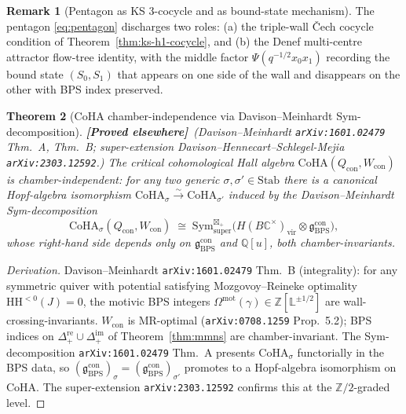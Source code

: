 \documentclass[11pt]{amsart}
\newtheorem{theorem}{Theorem}[section]
\theoremstyle{definition}
\newtheorem{remark}[theorem]{Remark}
\providecommand{\CoHA}{\mathrm{CoHA}}
\providecommand{\bZ}{\mathbb{Z}}
\providecommand{\bC}{\mathbb{C}}
\providecommand{\bL}{\mathbb{L}}
\providecommand{\bQ}{\mathbb{Q}}
\providecommand{\fg}{\mathfrak{g}}
\providecommand{\ClaimStatusProvedElsewhere}{\textbf{\textsf{[Proved elsewhere]}}}
\begin{document}
\begin{remark}[Pentagon as KS 3-cocycle and as bound-state mechanism]
\label{rem:pentagon-cocycle}
The pentagon \eqref{eq:pentagon} discharges two roles: (a) the
triple-wall \v{C}ech cocycle condition of
Theorem~\ref{thm:ks-h1-cocycle}, and (b) the Denef multi-centre
attractor flow-tree identity, with the middle factor $\Psi(q^{-1/2}
x_0 x_1)$ recording the bound state $(S_0, S_1)$ that appears on one
side of the wall and disappears on the other with BPS index
preserved.
\end{remark}

\begin{theorem}[CoHA chamber-independence via Davison--Meinhardt Sym-decomposition]
\label{thm:coha-chamber-inv}
\ClaimStatusProvedElsewhere\ \emph{(Davison--Meinhardt
\texttt{arXiv:1601.02479} Thm.~A, Thm.~B; super-extension
Davison--Hennecart--Schlegel-Mejia \texttt{arXiv:2303.12592}.)}
The critical cohomological Hall algebra $\CoHA(Q_{\mathrm{con}},
W_{\mathrm{con}})$ is chamber-independent: for any two generic
$\sigma, \sigma' \in \mathrm{Stab}$ there is a canonical Hopf-algebra
isomorphism $\CoHA_\sigma \xrightarrow{\sim} \CoHA_{\sigma'}$ induced
by the Davison--Meinhardt Sym-decomposition
\[
  \CoHA_\sigma(Q_{\mathrm{con}}, W_{\mathrm{con}})
  \;\cong\;
  \mathrm{Sym}^{\boxtimes_+}_{\mathrm{super}}\!\bigl(
    H(B\bC^\times)_{\mathrm{vir}} \otimes
    \fg_{\mathrm{BPS}}^{\mathrm{con}}
  \bigr),
\]
whose right-hand side depends only on
$\fg_{\mathrm{BPS}}^{\mathrm{con}}$ and $\bQ[u]$, both
chamber-invariants.
\end{theorem}

\begin{proof}[Derivation]
Davison--Meinhardt \texttt{arXiv:1601.02479} Thm.~B (integrality):
for any symmetric quiver with potential satisfying Mozgovoy--Reineke
optimality $\mathrm{HH}^{<0}(J) = 0$, the motivic BPS integers
$\Omega^{\mathrm{mot}}(\gamma) \in \bZ[\bL^{\pm 1/2}]$ are
wall-crossing-invariants. $W_{\mathrm{con}}$ is MR-optimal
(\texttt{arXiv:0708.1259} Prop.~5.2); BPS indices on
$\Delta_+^{\mathrm{re}} \cup \Delta_+^{\mathrm{im}}$ of
Theorem~\ref{thm:mmns} are chamber-invariant. The Sym-decomposition
\texttt{arXiv:1601.02479} Thm.~A presents $\CoHA_\sigma$ functorially
in the BPS data, so $(\fg_{\mathrm{BPS}}^{\mathrm{con}})_\sigma =
(\fg_{\mathrm{BPS}}^{\mathrm{con}})_{\sigma'}$ promotes to a
Hopf-algebra isomorphism on $\CoHA$. The super-extension
\texttt{arXiv:2303.12592} confirms this at the $\bZ/2$-graded level.
\end{proof}
\end{document}

